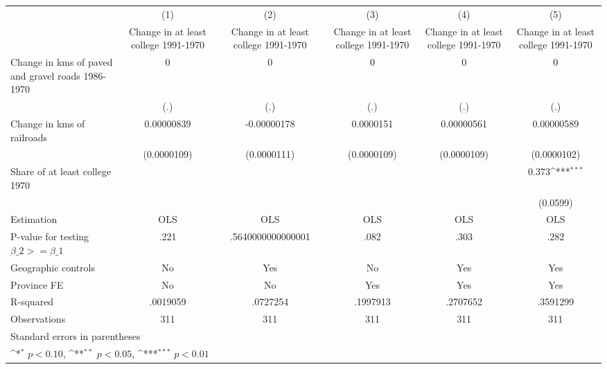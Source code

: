 {
\def\sym#1{\ifmmode^{#1}\else\(^{#1}\)\fi}
\begin{tabular}{l*{5}{c}}
\hline\hline
                    &\multicolumn{1}{c}{(1)}&\multicolumn{1}{c}{(2)}&\multicolumn{1}{c}{(3)}&\multicolumn{1}{c}{(4)}&\multicolumn{1}{c}{(5)}\\
                    &\multicolumn{1}{c}{Change in at least college 1991-1970}&\multicolumn{1}{c}{Change in at least college 1991-1970}&\multicolumn{1}{c}{Change in at least college 1991-1970}&\multicolumn{1}{c}{Change in at least college 1991-1970}&\multicolumn{1}{c}{Change in at least college 1991-1970}\\
\hline
Change in kms of paved and gravel roads 1986-1970&           0         &           0         &           0         &           0         &           0         \\
                    &         (.)         &         (.)         &         (.)         &         (.)         &         (.)         \\
[1em]
Change in kms of railroads&  0.00000839         & -0.00000178         &   0.0000151         &  0.00000561         &  0.00000589         \\
                    & (0.0000109)         & (0.0000111)         & (0.0000109)         & (0.0000109)         & (0.0000102)         \\
[1em]
Share of at least college 1970&                     &                     &                     &                     &       0.373\sym{***}\\
                    &                     &                     &                     &                     &    (0.0599)         \\
\hline
Estimation          &         OLS         &         OLS         &         OLS         &         OLS         &         OLS         \\
P-value for testing $\beta\_2 >= \beta\_1$&        .221         &.5640000000000001         &        .082         &        .303         &        .282         \\
Geographic controls &          No         &         Yes         &          No         &         Yes         &         Yes         \\
Province FE         &          No         &          No         &         Yes         &         Yes         &         Yes         \\
R-squared           &    .0019059         &    .0727254         &    .1997913         &    .2707652         &    .3591299         \\
Observations        &         311         &         311         &         311         &         311         &         311         \\
\hline\hline
\multicolumn{6}{l}{\footnotesize Standard errors in parentheses}\\
\multicolumn{6}{l}{\footnotesize \sym{*} \(p<0.10\), \sym{**} \(p<0.05\), \sym{***} \(p<0.01\)}\\
\end{tabular}
}
